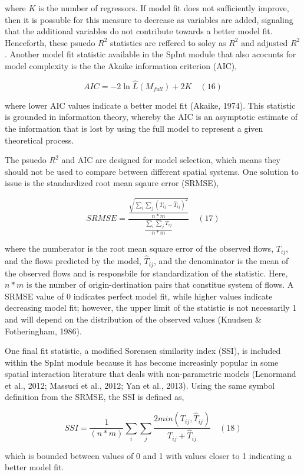 \documentclass[11pt]{article}
\begin{document}
where \(K\) is the number of regressors. If model fit does not
sufficiently improve, then it is possuble for this measure to decrease
as variables are added, signaling that the additional variables do not
contribute towards a better model fit. Henceforth, these psuedo \(R^2\)
statistics are reffered to soley as \(R^2\) and adjusted \(R^2\).
Another model fit statistic available in the SpInt module that also
acocunts for model complexity is the the Akaike information criterion
(AIC),

\[ AIC = -2\ln \hat{L}(M_{full}) + 2K  \quad(16)\]

where lower AIC values indicate a better model fit (Akaike, 1974). This
statistic is grounded in information theory, whereby the AIC is an
asymptotic estimate of the information that is lost by using the full
model to represent a given theoretical process.

The psuedo \(R^2\) and AIC are designed for model selection, which means
they should not be used to compare between different spatial systems.
One solution to issue is the standardized root mean sqaure error
(SRMSE),

\[ SRMSE = \frac{\frac{\sqrt{\sum_{i}\sum_{j}(T_{ij} - \hat{T}_{ij})^{2}}}{n*m}}{\frac{\sum_{i}\sum_{j}T_{ij}}{n*m}} \quad(17)\]

where the numberator is the root mean square error of the observed
flows, \(T_{ij}\), and the flows predicted by the model,
\(\hat{T}_{ij}\), and the denominator is the mean of the observed flows
and is responsbile for standardization of the statistic. Here, \(n*m\)
is the number of origin-destination pairs that constitue system of
flows. A SRMSE value of 0 indicates perfect model fit, while higher
values indicate decreasing model fit; however, the upper limit of the
statistic is not necessarily 1 and will depend on the distribution of
the observed values (Knudsen \& Fotheringham, 1986).

One final fit statistic, a modified Sorensen similarity index (SSI), is
included within the SpInt module because it has become increasinly
popular in some spatial interaction literature that deals with
non-parametric models (Lenormand et al., 2012; Massuci et al., 2012; Yan
et al., 2013). Using the same symbol definition from the SRMSE, the SSI
is defined as,

\[ SSI = \frac{1}{(n*m)} \sum_{i} \sum_{j} \frac{2min(T_{ij}, \hat{T}_{ij})}{T_{ij} + \hat{T}_{ij}} \quad(18)\]

which is bounded between values of 0 and 1 with values closer to 1
indicating a better model fit.
\end{document}
